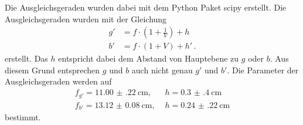 Die Ausgleichsgeraden wurden dabei mit dem Python Paket scipy \cite{scipy} erstellt.
Die Ausgleichsgeraden wurden mit der Gleichung 
\begin{align}
    g' &= f \cdot \left( 1+\frac{1}{V} \right) + h \label{eq:abbe_g} \\
    b' &= f \cdot \left( 1+V \right) + h' \, .
    \label{eq:abbe_b}
\end{align}
erstellt.
Das $h$ entspricht dabei dem Abstand von Hauptebene zu $g$ oder $b$.
Aus diesem Grund entsprechen $g$ und $b$ auch nicht genau $g'$ und $b'$.
Die Parameter der Ausgleichsgeraden werden auf 
\begin{align*}
    f_{g'} = \SI{11.00(22)}{\centi\meter}, & \,\,h = \SI{0.3(4)}{\centi\meter}\\
    f_{b'} = \SI{13.12(8)}{\centi\meter}, & \,\, h = \SI{0.24(22)}{\centi\meter}
\end{align*}
bestimmt.
